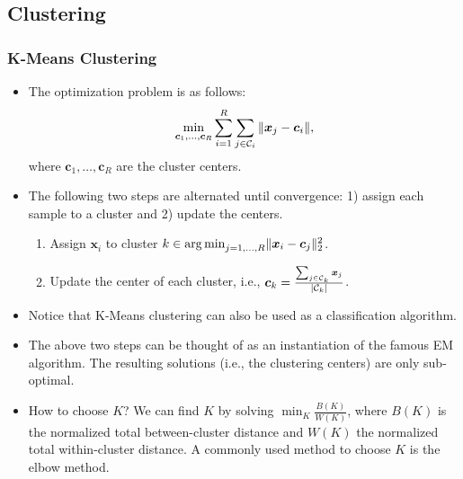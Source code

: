 \subsection{Clustering}
    \subsubsection{K-Means Clustering}
        \begin{itemize}
             
            \item The optimization problem is as follows:
            \begin{equation}
                \min_{\bm{c}_1, \ldots, \bm{c}_R} \sum_{i=1}^{R}{
                    \sum_{j \in \mathcal{C}_i}^{}{\lVert\bm{x}_j - \bm{c}_i\rVert}
                },
            \end{equation}
            where $\bm{c}_1, \ldots, \bm{c}_R$ are the cluster centers. 
            
            \item The following two steps are alternated until convergence: 1) assign each sample to a cluster and 2) update the centers.
            \begin{enumerate}
                \item Assign $\bm{x}_i$ to cluster $k \in \operatorname{arg\,min}_{j=1,\ldots, R}\lVert\bm{x}_i - \bm{c}_j\rVert_2^2$.
                \item Update the center of each cluster, i.e., $\bm{c}_k = \frac{\sum_{j \in \mathcal{C}_k}^{}{\bm{x}_j}}{| \mathcal{C}_k |}$.
            \end{enumerate}
            \item Notice that K-Means clustering can also be used as a classification algorithm. 
            \item The above two steps can be thought of as an instantiation of the famous EM algorithm.
            The resulting solutions (i.e., the clustering centers) are only sub-optimal.
            \item How to choose $K$? We can find $K$ by solving $\min_{K} \frac{B(K)}{W(K)}$, where $B(K)$ is the normalized total between-cluster distance and $W(K)$ the normalized total within-cluster distance. 
            A commonly used method to choose $K$ is the elbow method.
        \end{itemize}
    
